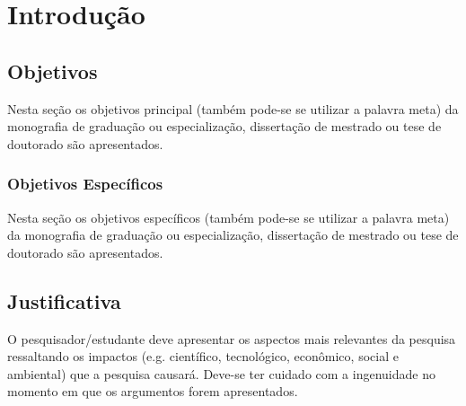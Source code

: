 \chapter{Introdução}
\label{chap:intro}

\cite{Barabasi2003-1}

\section{Objetivos}
\label{sec:obj}

Nesta se\c{c}\~ao os objetivos principal (tamb\'em
pode-se se utilizar a palavra meta) da monografia de
gradua\c{c}\~ao ou especializa\c{c}\~ao, disserta\c{c}\~ao de
mestrado ou tese de doutorado s\~ao apresentados.


\subsection{Objetivos Específicos}
\label{ssec:objesp}

Nesta se\c{c}\~ao os objetivos espec\'ificos (tamb\'em
pode-se se utilizar a palavra meta) da monografia de
gradua\c{c}\~ao ou especializa\c{c}\~ao, disserta\c{c}\~ao de
mestrado ou tese de doutorado s\~ao apresentados.


\section{Justificativa}
\label{sec:justi}

O pesquisador/estudante deve apresentar os aspectos mais
relevantes da pesquisa ressaltando os impactos (e.g. cient\'ifico,
tecnol\'ogico, econ\^omico, social e ambiental) que a pesquisa
causar\'a. Deve-se ter cuidado com a ingenuidade no momento em que
os argumentos forem apresentados.


